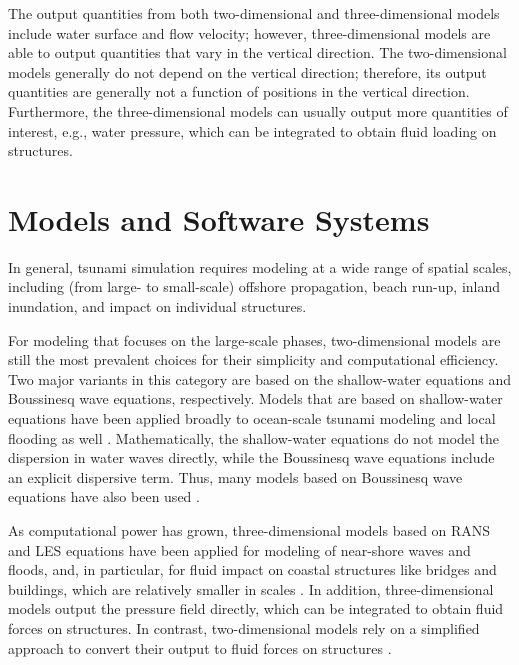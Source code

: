 The output quantities from both two-dimensional and three-dimensional models include water surface and flow velocity; however, three-dimensional models are able to output quantities that vary in the vertical direction. The two-dimensional models generally do not depend on the vertical direction; therefore, its output quantities are generally not a function of positions in the vertical direction. Furthermore, the three-dimensional models can usually output more quantities of interest, e.g., water pressure, which can be integrated to obtain fluid loading on structures.

\section{Models and Software Systems}
\label{sec:tsunami_tools}

In general, tsunami simulation requires modeling at a wide range of spatial scales, including (from large- to small-scale) offshore propagation, beach run-up, inland inundation, and impact on individual structures.

For modeling that focuses on the large-scale phases, two-dimensional models are still the most prevalent choices for their simplicity and computational efficiency. Two major variants in this category are based on the shallow-water equations and Boussinesq wave equations, respectively. Models that are based on shallow-water equations have been applied broadly to ocean-scale tsunami modeling and local flooding as well \citep{berger2011geoclaw, george2004numerical, george2008augmented, hu2000numerical, hubbard20022d, popinet2012adaptive, qin2018comparison, wei2013dynamic}. Mathematically, the shallow-water equations do not model the dispersion in water waves directly, while the Boussinesq wave equations include an explicit dispersive term. Thus, many models based on Boussinesq wave equations have also been used \citep{kim2009depthintegrated, kim2017boussinesq, lynett2010application, madsen2003boussinesqtype, madsen1992new, shi2012highorder}. 

As computational power has grown, three-dimensional models based on RANS and LES equations have been applied for modeling of near-shore waves and floods, and, in particular, for fluid impact on coastal structures like bridges and buildings, which are relatively smaller in scales \citep{biscarini2010computational, choi2007threedimensional, larsen2017tsunamiinduced, mayer2000simulation, montagna20113d, williams2016numerical}. In addition, three-dimensional models output the pressure field directly, which can be integrated to obtain fluid forces on structures. In contrast, two-dimensional models rely on a simplified approach to convert their output to fluid forces on structures \citep{motley2016, qin2016threedimensional, qin2018comparison, sarfaraz2017sph}.

